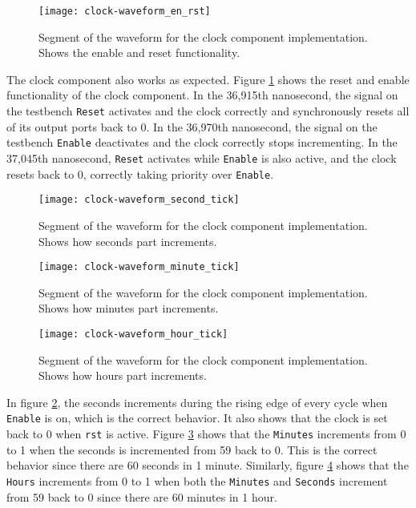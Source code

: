 \documentclass[11pt]{report}
\begin{document}
\begin{figure}[h!]
    \centering
    \texttt{[image: clock-waveform\_en\_rst]}
    \caption{
        Segment of the waveform for the clock component implementation. Shows the enable and reset
        functionality.
    }
    \label{fig:clock-waveform_en_rst}
\end{figure}

The clock component also works as expected. Figure \ref{fig:clock-waveform_en_rst} shows the reset
and enable functionality of the clock component. In the 36,915th nanosecond, the signal on the
testbench \verb|Reset| activates and the clock correctly and synchronously resets all of its output
ports back to 0. In the 36,970th nanosecond, the signal on the testbench \verb|Enable| deactivates
and the clock correctly stops incrementing. In the 37,045th nanosecond, \verb|Reset| activates while
\verb|Enable| is also active, and the clock resets back to 0, correctly taking priority over
\verb|Enable|.

\begin{figure}[h!]
    \centering
    \texttt{[image: clock-waveform\_second\_tick]}
    \caption{
        Segment of the waveform for the clock component implementation. Shows how seconds part
        increments.
    }
    \label{fig:clock-waveform_second_tick}
\end{figure}

\begin{figure}[h!]
    \centering
    \texttt{[image: clock-waveform\_minute\_tick]}
    \caption{
        Segment of the waveform for the clock component implementation. Shows how minutes part
        increments.
    }
    \label{fig:clock-waveform_minute_tick}
\end{figure}

\begin{figure}[h!]
    \centering
    \texttt{[image: clock-waveform\_hour\_tick]}
    \caption{
        Segment of the waveform for the clock component implementation. Shows how hours part
        increments.
    }
    \label{fig:clock-waveform_hour_tick}
\end{figure}

In figure \ref{fig:clock-waveform_second_tick}, the seconds increments during the rising edge of
every cycle when \verb|Enable| is on, which is the correct behavior. It also shows that the clock is
set back to 0 when \verb|rst| is active. Figure \ref{fig:clock-waveform_minute_tick} shows that the
\verb|Minutes| increments from 0 to 1 when the seconds is incremented from 59 back to 0. This is the
correct behavior since there are 60 seconds in 1 minute. Similarly, figure
\ref{fig:clock-waveform_hour_tick} shows that the \verb|Hours| increments from 0 to 1 when both the
\verb|Minutes| and \verb|Seconds| increment from 59 back to 0 since there are 60 minutes in 1 hour.
\end{document}
